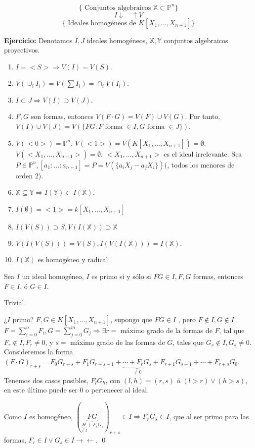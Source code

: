 \begin{Cor}
$$\{ \text{ Conjuntos algebraicos } \mathbb{X}\subset \mathbb{P}^n  \}$$
 $$I \downarrow \quad \uparrow V $$
$$\{ \text{ Ideales homogéneos de } K[X_1,\dots ,X_{n+1}] \}$$
\end{Cor}

\textbf{Ejercicio:} Denotamos $I,J$ ideales homogéneos, $\mathbb{X}, \mathbb{Y}$ conjuntos algebraicos proyectivos.

\begin{enumerate}
\item $I=<S> \Rightarrow V(I)=V(S)$.
\item $V(\cup_i I_i)= V(\sum I_i) = \cap_i V(I_i)$. 
\item $I\subset J \Rightarrow V(I)\supset V(J)$. 
\item $F,G$ son formas, entonces $V(F\cdot G)=V(F)\cup V(G)$. Por tanto, $V(I)\cup V(J)= V(\{ FG : F \text{ forma } \in I, G \text{ forma } \in J \})$. 
\item $V(<0>) = \mathbb{P}^n$. $V(<1>)=V(K[X_1,\dots ,X_{n+1}])=\emptyset $. $V(<X_1,\dots ,X_{n+1}>)=\emptyset $, $<X_1,\dots ,X_{n+1}>$ es el ideal irrelevante. Sea $P\in \mathbb{P}^n, [a_1:\dots :a_{n+1}]=P=V(\{a_iX_j-a_jX_i \} ) $(, todos los menores de orden 2).
\item $\mathbb{X} \subseteq \mathbb{Y} \Rightarrow I(\mathbb{Y})\subset I(\mathbb{X})$. 
\item $I(\emptyset ) = <1>=k[X_1,\dots ,X_{n+1}]$ 
\item $I(V(S)) \supset S, V(I(\mathbb{X})) \supset \mathbb{X} $
\item $V(I(V(S)))=V(S), I(V(I(\mathbb{X})))=I(\mathbb{X})$. 
\item $I(\mathbb{X})$ es homogéneo y radical. 
\end{enumerate} 

\begin{Lem}
Sea $I$ un ideal homogéneo, $I$ es primo si y sólo si $FG\in I, F,G$ formas, entonces $F\in I$, ó $G\in I$. 
\end{Lem}

\begin{Dem}
\framebox{$\Rightarrow $} Trivial.

\framebox{$\Leftarrow $} ¿$I$ primo? $F,G\in K[X_1,\dots ,X_{n+1}]$, supongo que $FG \in I$ , pero $F\notin I, G\notin I$. $F=\sum_{i=0}^n F_i, G=\sum_{j=0}^m G_j \Rightarrow \exists r=$ máximo grado de la formas de $F$, tal que $F_r\notin I, F_r \neq 0$, y $s=$ máximo grado de las formas de $G$, tales que $G_s \notin I, G_s \neq 0$. Consideremos la forma $(F\cdot G)_{r+s}=F_0G_{r+s}+F_1G_{r+s-1}+\underbrace{\cdots + F_rG_s}_{\neq 0} + F_{r+1}G_{s-1}+\cdots + F_{r+s}G_0$. Tenemos dos casos posibles, $F_lG_h$, con $(l,h)=(r,s)$ ó $(l>r)\vee (h>s)$, en este último puede ser 0 o pertenecer al ideal.

Como $I$ es homogéneo, $(\underbrace{FG}_{\underbrace{H}_{\in I}+F_rG_s})_{r+s}\in I \Rightarrow F_rG_s \in I$, que al ser primo para las formas, $F_r\in I \vee G_s \in I \rightarrow \leftarrow$. \qed
\end{Dem}

